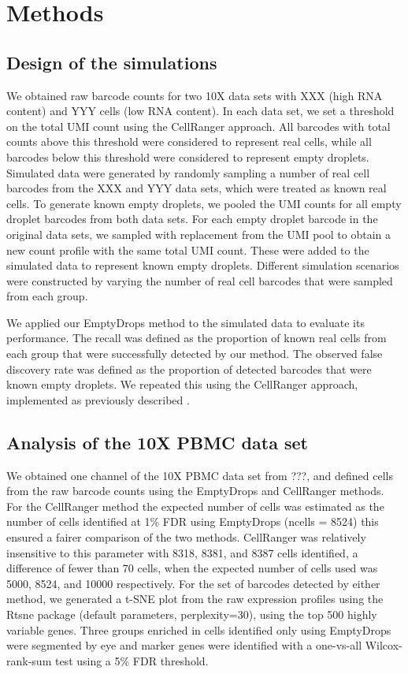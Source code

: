 \documentclass[10pt,letterpaper]{article}
\begin{document}
\section*{Methods}

\subsection*{Design of the simulations}
We obtained raw barcode counts for two 10X data sets with XXX (high RNA content) and YYY cells (low RNA content).
In each data set, we set a threshold on the total UMI count using the CellRanger approach.
All barcodes with total counts above this threshold were considered to represent real cells, while all barcodes below this threshold were considered to represent empty droplets.
Simulated data were generated by randomly sampling a number of real cell barcodes from the XXX and YYY data sets, which were treated as known real cells.
To generate known empty droplets, we pooled the UMI counts for all empty droplet barcodes from both data sets. 
For each empty droplet barcode in the original data sets, we sampled with replacement from the UMI pool to obtain a new count profile with the same total UMI count.
These were added to the simulated data to represent known empty droplets.
Different simulation scenarios were constructed by varying the number of real cell barcodes that were sampled from each group.

We applied our EmptyDrops method to the simulated data to evaluate its performance.
The recall was defined as the proportion of known real cells from each group that were successfully detected by our method.
The observed false discovery rate was defined as the proportion of detected barcodes that were known empty droplets.
We repeated this using the CellRanger approach, implemented as previously described \cite{zheng2017massively}.

\subsection*{Analysis of the 10X PBMC data set}
We obtained one channel of the 10X PBMC data set from ???, and defined cells from the raw barcode counts using the EmptyDrops and CellRanger methods. For the CellRanger method the expected number of cells was estimated as the number of cells identified at 1\% FDR using EmptyDrops (ncells = 8524) this ensured a fairer comparison of the two methods. CellRanger was relatively insensitive to this parameter with 8318, 8381, and 8387 cells identified, a difference of fewer than 70 cells, when the expected number of cells used was 5000, 8524, and 10000 respectively. 
For the set of barcodes detected by either method, we generated a t-SNE plot from the raw expression profiles using the Rtsne package (default parameters, perplexity=30), using the top 500 highly variable genes. Three groups enriched in cells identified only using EmptyDrops were segmented by eye and marker genes were identified with a one-vs-all Wilcox-rank-sum test using a 5\% FDR threshold.



\end{document}
